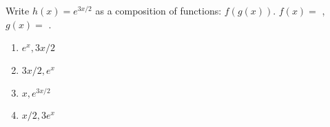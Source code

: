 \bigskip

\item Write $h(x) = e^{3x/2}$ as a composition of functions: $f(g(x))$.  $f(x) =$ \underline{\hspace{1in}}, $g(x) = $ \underline{\hspace{1in}}.

\begin{enumerate}
\item $e^x, 3x/2$
\item $3x/2, e^x$
\item $x, e^{3x/2}$
\item $x/2, 3 e^x$
\end{enumerate}

